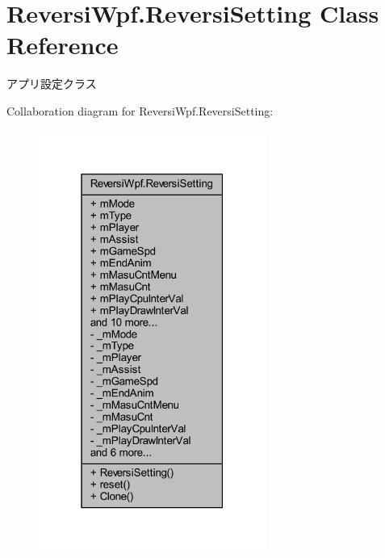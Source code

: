 \hypertarget{class_reversi_wpf_1_1_reversi_setting}{}\section{Reversi\+Wpf.\+Reversi\+Setting Class Reference}
\label{class_reversi_wpf_1_1_reversi_setting}


アプリ設定クラス  




Collaboration diagram for Reversi\+Wpf.\+Reversi\+Setting\+:\nopagebreak
\begin{figure}[H]
\begin{center}
\leavevmode
\includegraphics[width=211pt]{class_reversi_wpf_1_1_reversi_setting__coll__graph}
\end{center}
\end{figure}
